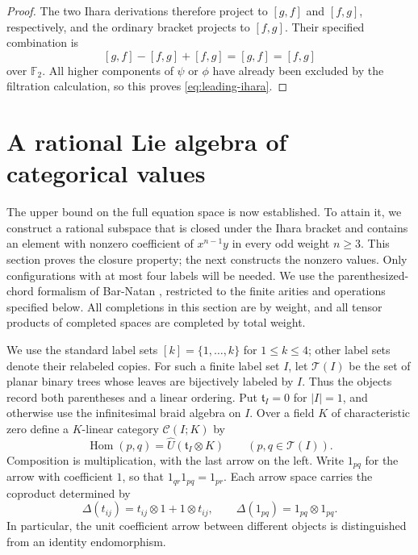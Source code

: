 \documentclass[11pt]{article}
\newcommand{\F}{{\mathbb F_2}}
\theoremstyle{definition}
\theoremstyle{remark}
\numberwithin{equation}{section}
\begin{document}
\begin{proof}
The two Ihara derivations therefore project to $[g,f]$ and
$[f,g]$, respectively, and the ordinary bracket projects to
$[f,g]$.  Their specified combination is
\[
 [g,f]-[f,g]+[f,g]=[g,f]=[f,g]
\]
over $\F$.
All higher components of $\psi$ or $\phi$ have already been
excluded by the filtration calculation, so this proves
\eqref{eq:leading-ihara}.
\end{proof}

\section{A rational Lie algebra of categorical values}\label{sec:category}

The upper bound on the full equation space is now established.  To
attain it, we construct a rational subspace that is closed under the
Ihara bracket and contains an element with nonzero coefficient of
$x^{n-1}y$ in every odd weight $n\geq3$.  This section proves the
closure property; the next constructs the nonzero values.
Only configurations with at most four labels will be needed.
We use the parenthesized-chord formalism of Bar-Natan
\cite[Sections~2--3]{BarNatan}, restricted to the finite arities and
operations specified below.
All completions in this section are by weight, and all tensor products of
completed spaces are completed by total weight.

We use the standard label sets $[k]=\{1,\ldots,k\}$ for
$1\leq k\leq4$; other label sets denote their relabeled copies.
For such a finite label set $I$, let
$\mathcal T(I)$ be the set of planar binary trees whose leaves are
bijectively labeled by $I$.  Thus the objects record both parentheses and
a linear ordering.  Put $\mathfrak t_I=0$ for $|I|=1$, and otherwise use
the infinitesimal braid algebra on $I$.  Over a field $K$ of
characteristic zero define a $K$-linear category $\mathcal C(I;K)$ by
\[
 \operatorname{Hom}(p,q)=\widehat U(\mathfrak t_I\otimes K)
 \qquad(p,q\in\mathcal T(I)).
\]
Composition is multiplication, with the last arrow on the left.  Write
$1_{pq}$ for the arrow with coefficient $1$, so that
$1_{qr}1_{pq}=1_{pr}$.  Each arrow space carries the coproduct determined
by
\[
 \Delta(t_{ij})=t_{ij}\otimes1+1\otimes t_{ij},
 \qquad \Delta(1_{pq})=1_{pq}\otimes1_{pq}.
\]
In particular, the unit coefficient arrow between different objects is
distinguished from an identity endomorphism.
\end{document}
